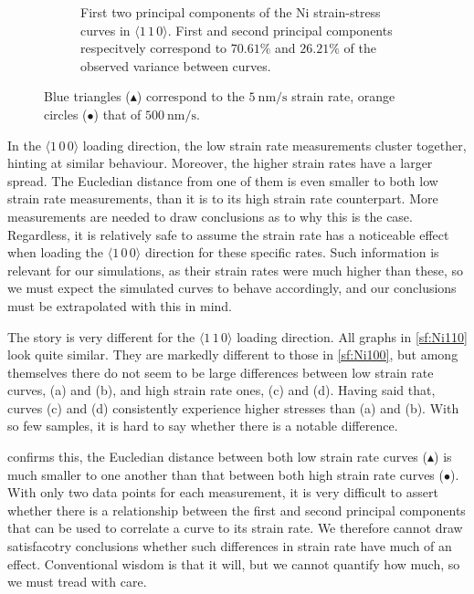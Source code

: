 \begin{figure}
\begin{subfigure}[t]{0.45\linewidth}
        \caption[First two principal components of the Ni strain-stress curves in $\langle 1\,1\,0 \rangle$.]{First two principal components of the Ni strain-stress curves in $\langle 1\,1\,0 \rangle$. First and second principal components respecitvely correspond to $70.61\%$ and $26.21\%$ of the observed variance between curves.}
        \label{sf:Ni110_pca}
    \end{subfigure}
    \caption{Blue triangles (\textcolor{matlabBlue}{$\blacktriangle$}) correspond to the $\SI{5}{\nano\metre\per\second}$ strain rate, orange circles (\textcolor{matlabOrange}{$\bullet$}) that of $\SI{500}{\nano\metre\per\second}$.}
    \label{f:Ni_pca}
\end{figure}

In the $\langle 1\, 0\, 0 \rangle$ loading direction, the low strain rate measurements cluster together, hinting at similar behaviour. Moreover, the higher strain rates have a larger spread. The Eucledian distance from one of them is even smaller to both low strain rate measurements, than it is to its high strain rate counterpart. More measurements are needed to draw conclusions as to why this is the case. Regardless, it is relatively safe to assume the strain rate has a noticeable effect when loading the $\langle 1\, 0\, 0 \rangle$ direction for these specific rates. Such information is relevant for our simulations, as their strain rates were much higher than these, so we must expect the simulated curves to behave accordingly, and our conclusions must be extrapolated with this in mind.

The story is very different for the $\langle 1\, 1\, 0 \rangle$ loading direction. All graphs in \cref{sf:Ni110} look quite similar. They are markedly different to those in \cref{sf:Ni100}, but among themselves there do not seem to be large differences between low strain rate curves, (a) and (b), and high strain rate ones, (c) and (d). Having said that, curves (c) and (d) consistently experience higher stresses than (a) and (b). With so few samples, it is hard to say whether there is a notable difference.

 confirms this, the Eucledian distance between both low strain rate curves (\textcolor{matlabBlue}{$\blacktriangle$}) is much smaller to one another than that between both high strain rate curves (\textcolor{matlabOrange}{$\bullet$}). With only two data points for each measurement, it is very difficult to assert whether there is a relationship between the first and second principal components that can be used to correlate a curve to its strain rate. We therefore cannot draw satisfacotry conclusions whether such differences in strain rate have much of an effect. Conventional wisdom is that it will, but we cannot quantify how much, so we must tread with care.

